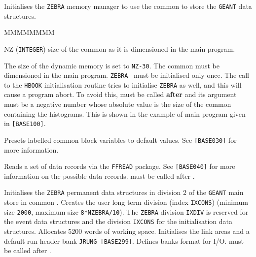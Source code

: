   
 
 
Initialises the {\tt ZEBRA} memory manager to use the common 
to store the {\tt GEANT} data structures.
\begin{DLtt}{MMMMMMMM}
\item[NZ] ({\tt INTEGER}) size of the  common as it is
dimensioned in the main program.
\end{DLtt}
The size of the dynamic memory is set to {\tt NZ-30}. The common
 must be dimensioned in the main program.
{\tt ZEBRA}~\cite{bib-ZEBRA} must be initialised only once. The call to the
{\tt HBOOK} initialisation routine  tries to initialise
{\tt ZEBRA} as well, and this will cause a program abort. To avoid this,
 must be called {\bf after}  and its argument
must be a negative number whose absolute value is the size of the
 common containing the histograms. This is shown in the
example of main program given in {\tt[BASE100]}.

Presets labelled common block variables to default values.
See {\tt[BASE030]} for more information.

Reads a set of data records via the {\tt FFREAD} package.
See {\tt[BASE040]} for more information on the possible data records.
 must be called after .


Initialises the {\tt ZEBRA} permanent data structures in division
2 of the {\tt GEANT} main store in common  .
Creates the user long term division (index {\tt IXCONS})
(minimum size {\tt 2000}, maximum size {\tt 8*NZEBRA/10}).
The {\tt ZEBRA} division {\tt IXDIV} is reserved for the event data structures
and the division {\tt IXCONS} for the initialisation data structures.
Allocates 5200 words of working space.
Initialises the link areas and a default run header bank {\tt JRUNG
[BASE299]}. Defines banks format for I/O.
 must be called after .
 
